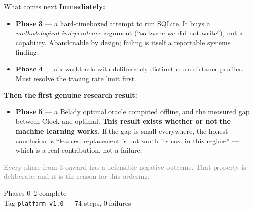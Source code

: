 \documentclass[10pt,aspectratio=169]{beamer}
\begin{document}
\begin{frame}{What comes next}
  \small
  \textbf{Immediately:}
  \begin{itemize}
    \item \textbf{Phase 3} --- a hard-timeboxed attempt to run SQLite. It buys a
          \emph{methodological independence} argument (``software we did not
          write''), not a capability. Abandonable by design; failing is itself
          a reportable systems finding.
    \item \textbf{Phase 4} --- six workloads with deliberately distinct
          reuse-distance profiles. \alert{Must resolve the tracing rate limit
          first.}
  \end{itemize}

  \medskip
  \textbf{Then the first genuine research result:}
  \begin{itemize}
    \item \textbf{Phase 5} --- a Belady optimal oracle computed offline, and the
          measured gap between Clock and optimal. \textbf{This result exists
          whether or not the machine learning works.} If the gap is small
          everywhere, the honest conclusion is ``learned replacement is not
          worth its cost in this regime'' --- which is a real contribution, not
          a failure.
  \end{itemize}

  \vspace{-1mm}
  \centering
  \textcolor{gray}{Every phase from 3 onward has a defensible negative outcome.
  That property is deliberate, and it is the reason for this ordering.}
\end{frame}

\begin{frame}[standout]
  Phases 0--2 complete\\[6pt]
  {\large\normalfont Tag \texttt{platform-v1.0} --- 74 steps, 0 failures}
\end{frame}
\end{document}
